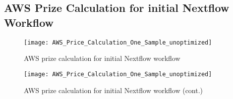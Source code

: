 \subsection{\ac{AWS} Prize Calculation for initial Nextflow Workflow}\label{appendix:awspricecalculationunoptimized}
\begin{figure}[H]
    \centering
	\texttt{[image: AWS\_Price\_Calculation\_One\_Sample\_unoptimized]}
	\caption{\ac{AWS} prize calculation for initial Nextflow workflow}
\end{figure}
\begin{figure}[H]\ContinuedFloat
    \centering
	\texttt{[image: AWS\_Price\_Calculation\_One\_Sample\_unoptimized]}
	\caption{\ac{AWS} prize calculation for initial Nextflow workflow (cont.)}
\end{figure}